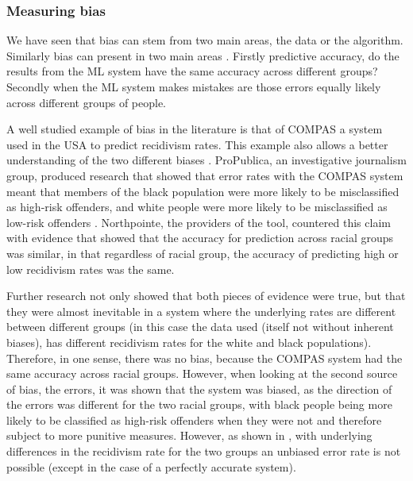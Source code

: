 \subsubsection{Measuring bias} We have seen that bias can stem from two main areas, the data or the algorithm. Similarly bias can present in two main areas \parencite{chouldechova2017fair}. Firstly predictive accuracy, do the results from the ML system have the same accuracy across different groups? Secondly when the ML system makes mistakes are those errors equally likely across different groups of people. 

A well studied example of bias in the literature is that of COMPAS a system used in the USA to predict recidivism rates. This example also allows a better understanding of the two different biases \parencite{kleinberg2016inherent, chouldechova2017fair}.  ProPublica, an investigative journalism group, produced research that showed that error rates with the COMPAS system meant that members of the black population were more likely to be misclassified as high-risk offenders, and white people were more likely to be misclassified as low-risk offenders   \parencite{jefflarson_2016}. Northpointe, the providers of the tool, countered this claim with evidence that showed that the accuracy for prediction across racial groups was similar, in that regardless of racial group, the accuracy of predicting high or low recidivism rates was the same.

Further research  \parencite{kleinberg2016inherent, chouldechova2017fair} not only showed that both pieces of evidence were true, but that they were almost inevitable in a system where the underlying rates are different between different groups (in this case the data used (itself not without inherent biases), has different recidivism rates for the white and black populations).  Therefore, in one sense, there was no bias, because the COMPAS system had the same accuracy across racial groups. However, when looking at the second source of bias, the errors, it was shown that the system was biased, as the direction of the errors was different for the two racial groups, with black people being more likely to be classified as high-risk offenders when they were not and therefore subject to more punitive measures. However, as shown in \textcite{kleinberg2016inherent}, with underlying differences in the recidivism rate for the two groups an unbiased error rate is not possible (except in the case of a perfectly accurate system). 

